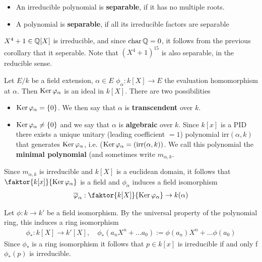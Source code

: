 \begin{dfn}[]
\begin{itemize}
  \item An irreducible polynomial is \textbf{separable}, if it has no multiple roots.
  \item A polynomial is \textbf{separable}, if all its irreducible factors are separable
\end{itemize}
\end{dfn}
\begin{ex}[]
  $X^{4} + 1 \in \mathbb{Q}[X]$ is irreducible, and since $\operatorname{char} \mathbb{Q} = 0$, it follows from the previous corollary that it seperable. 
  Note that $(X^{4} + 1)^{15}$ is also separable, in the reducible sense.
\end{ex}

Let $E/k$ be a field extension, $\alpha \in E$ $\phi_{\alpha}: k[X] \to  E$ the evaluation homomorphism at $\alpha$.
Then $\operatorname{Ker} \varphi_{\alpha}$ is an ideal in $k[X]$. There are two possibilities
\begin{itemize}
  \item $\operatorname{Ker} \varphi_{\alpha} = \{0\}$. We then say that $\alpha$ is \textbf{transcendent} over $k$.
  \item $\operatorname{Ker} \varphi_{\alpha} \neq \{0\}$ and we say that $\alpha$ is \textbf{algebraic} over $k$. Since $k[x]$ is a PID there exists a unique unitary (leading coefficient $= 1$) polynomial $\text{irr}(\alpha,k)$ that generates $\operatorname{Ker} \varphi_{\alpha}$, i.e. ($\operatorname{Ker} \varphi_{\alpha} = (\text{irr}(\alpha,k))$.
    We call this polynomial the \textbf{minimal polynomial} (and sometimes write $m_{\alpha,k}$.
\end{itemize}
Since $m_{\alpha,k}$ is irreducible and $k[X]$ is a euclidean domain, it follows that $\faktor{k[x]}{\Ker \phi_{\alpha}}$ is a field and
$\phi_{\alpha}$ induces a field isomorphism
\begin{align*}
  \overline{\phi}_{\alpha}: \faktor{k[X]}{\Ker \phi_{\alpha}} \to k(\alpha) 
\end{align*}


Let $\phi: k \to  k'$ be a field isomorphism. By the universal property of the polynomial ring, this induces a ring isomorphism
\begin{align*}
  \phi_{\ast}: k[X] \to k'[X], \quad \phi_{\ast}(a_nX^{n} + \ldots a_0) := \phi(a_n)X^{n} + \ldots \phi(a_0)
\end{align*}
Since $\phi_{\ast}$ is a ring isomorphism it follows that $p \in k[x]$ is irreducible if and only f $\phi_{\ast}(p)$ is irreducible.

